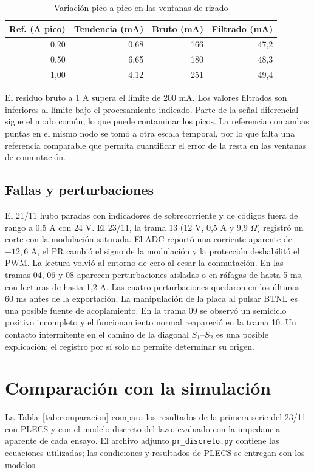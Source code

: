 \documentclass[conference]{IEEEtran}
\begin{document}
\begin{table}[H]\centering\small
\caption{Variación pico a pico en las ventanas de rizado}
\label{tab:rizado_final}
\begin{tabular}{@{}rrrr@{}}\toprule
Ref. (A pico) & Tendencia (mA) & Bruto (mA) & Filtrado (mA)\\\midrule
0,20 & 0,68 & 166 & 47,2\\
0,50 & 6,65 & 180 & 48,3\\
1,00 & 4,12 & 251 & 49,4\\\bottomrule
\end{tabular}
\end{table}
El residuo bruto a 1 A supera el límite de 200 mA. Los valores filtrados son inferiores al límite bajo el procesamiento indicado. Parte de la señal diferencial sigue el modo común, lo que puede contaminar los picos. La referencia con ambas puntas en el mismo nodo se tomó a otra escala temporal, por lo que falta una referencia comparable que permita cuantificar el error de la resta en las ventanas de conmutación.

\subsection{Fallas y perturbaciones}
El 21/11 hubo paradas con indicadores de sobrecorriente y de códigos fuera de rango a 0,5 A con 24 V. El 23/11, la trama 13 (12 V, 0,5 A y 9,9 $\Omega$) registró un corte con la modulación saturada. El ADC reportó una corriente aparente de $-12{,}6$ A, el PR cambió el signo de la modulación y la protección deshabilitó el PWM. La lectura volvió al entorno de cero al cesar la conmutación. En las tramas 04, 06 y 08 aparecen perturbaciones aisladas o en ráfagas de hasta 5 ms, con lecturas de hasta 1,2 A. Las cuatro perturbaciones quedaron en los últimos 60 ms antes de la exportación. La manipulación de la placa al pulsar BTNL es una posible fuente de acoplamiento. En la trama 09 se observó un semiciclo positivo incompleto y el funcionamiento normal reapareció en la trama 10. Un contacto intermitente en el camino de la diagonal $S_1$--$S_2$ es una posible explicación; el registro por sí solo no permite determinar su origen.

\section{Comparación con la simulación}
La Tabla~\ref{tab:comparacion} compara los resultados de la primera serie del 23/11 con PLECS y con el modelo discreto del lazo, evaluado con la impedancia aparente de cada ensayo. El archivo adjunto \texttt{pr\_discreto.py} contiene las ecuaciones utilizadas; las condiciones y resultados de PLECS se entregan con los modelos.
\end{document}
